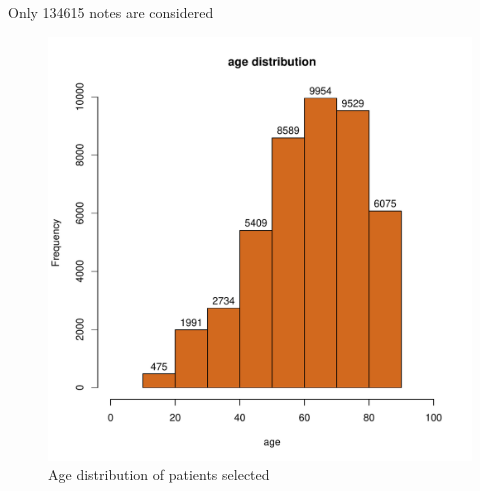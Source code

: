 \documentclass[10pt,a4paper]{report}
\begin{document}
	Only 134615 notes are considered
	\begin{figure}[h!]
		\centering
		\includegraphics[width=0.6\linewidth]{img/age-distr}
		\caption{Age distribution of patients selected}
		\label{fig:age-distr}
	\end{figure}
	
\end{document}
